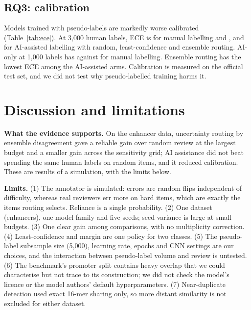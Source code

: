 \documentclass[11pt]{article}
\begin{document}
\subsection{RQ3: calibration}
\begin{table}[t]
\centering\small

\caption{Expected calibration error (15 bins, lower is better), main cell, mean over seeds.}\label{tab:ece}
\end{table}
Models trained with pseudo-labels are markedly worse calibrated (Table~\ref{tab:ece}). At 3{,}000 human labels, ECE is \EceManThree{} for manual labelling and \EceRandThree{}, \EceLcThree{} and \EceEnsThree{} for AI-assisted labelling with random, least-confidence and ensemble routing. AI-only at 1{,}000 labels has \EceAiOnlyOne{} against \EceManOne{} for manual labelling. Ensemble routing has the lowest ECE among the AI-assisted arms. Calibration is measured on the official test set, and we did not test why pseudo-labelled training harms it.

\section{Discussion and limitations}
\textbf{What the evidence supports.} On the enhancer data, uncertainty routing by ensemble disagreement gave a reliable gain over random review at the largest budget and a smaller gain across the sensitivity grid; AI assistance did not beat spending the same human labels on random items, and it reduced calibration. These are results of a simulation, with the limits below.

\textbf{Limits.} (1) The annotator is simulated: errors are random flips independent of difficulty, whereas real reviewers err more on hard items, which are exactly the items routing selects. Reliance is a single probability. (2) One dataset (enhancers), one model family and five seeds; seed variance is large at small budgets. (3) One clear gain among \nComp{} comparisons, with no multiplicity correction. (4) Least-confidence and margin are one policy for two classes. (5) The pseudo-label subsample size (5{,}000), learning rate, epochs and CNN settings are our choices, and the interaction between pseudo-label volume and review is untested. (6) The benchmark's promoter split contains heavy overlap that we could characterise but not trace to its construction; we did not check the model's licence or the model authors' default hyperparameters. (7) Near-duplicate detection used exact 16-mer sharing only, so more distant similarity is not excluded for either dataset.
\end{document}
